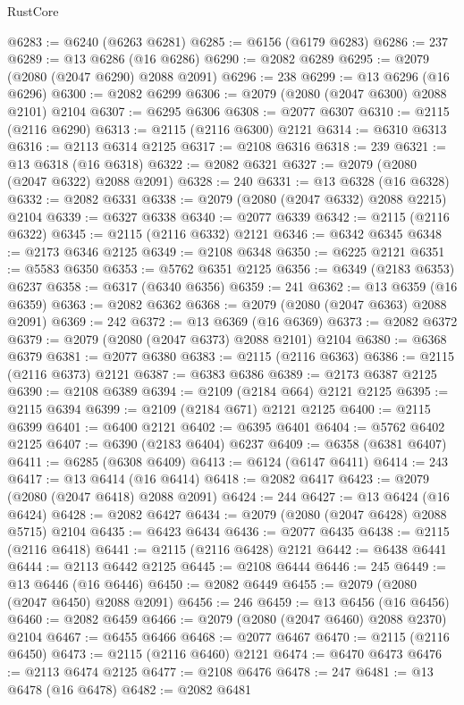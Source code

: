 \begin{lexlean}{RustCore}
\begin{coremodule}
@6283 := @6240 (@6263 @6281)
@6285 := @6156 (@6179 @6283)
@6286 := 237
@6289 := @13 @6286 (@16 @6286)
@6290 := @2082 @6289
@6295 := @2079 (@2080 (@2047 @6290) @2088 @2091)
@6296 := 238
@6299 := @13 @6296 (@16 @6296)
@6300 := @2082 @6299
@6306 := @2079 (@2080 (@2047 @6300) @2088 @2101) @2104
@6307 := @6295 @6306
@6308 := @2077 @6307
@6310 := @2115 (@2116 @6290)
@6313 := @2115 (@2116 @6300) @2121
@6314 := @6310 @6313
@6316 := @2113 @6314 @2125
@6317 := @2108 @6316
@6318 := 239
@6321 := @13 @6318 (@16 @6318)
@6322 := @2082 @6321
@6327 := @2079 (@2080 (@2047 @6322) @2088 @2091)
@6328 := 240
@6331 := @13 @6328 (@16 @6328)
@6332 := @2082 @6331
@6338 := @2079 (@2080 (@2047 @6332) @2088 @2215) @2104
@6339 := @6327 @6338
@6340 := @2077 @6339
@6342 := @2115 (@2116 @6322)
@6345 := @2115 (@2116 @6332) @2121
@6346 := @6342 @6345
@6348 := @2173 @6346 @2125
@6349 := @2108 @6348
@6350 := @6225 @2121
@6351 := @5583 @6350
@6353 := @5762 @6351 @2125
@6356 := @6349 (@2183 @6353) @6237
@6358 := @6317 (@6340 @6356)
@6359 := 241
@6362 := @13 @6359 (@16 @6359)
@6363 := @2082 @6362
@6368 := @2079 (@2080 (@2047 @6363) @2088 @2091)
@6369 := 242
@6372 := @13 @6369 (@16 @6369)
@6373 := @2082 @6372
@6379 := @2079 (@2080 (@2047 @6373) @2088 @2101) @2104
@6380 := @6368 @6379
@6381 := @2077 @6380
@6383 := @2115 (@2116 @6363)
@6386 := @2115 (@2116 @6373) @2121
@6387 := @6383 @6386
@6389 := @2173 @6387 @2125
@6390 := @2108 @6389
@6394 := @2109 (@2184 @664) @2121 @2125
@6395 := @2115 @6394
@6399 := @2109 (@2184 @671) @2121 @2125
@6400 := @2115 @6399
@6401 := @6400 @2121
@6402 := @6395 @6401
@6404 := @5762 @6402 @2125
@6407 := @6390 (@2183 @6404) @6237
@6409 := @6358 (@6381 @6407)
@6411 := @6285 (@6308 @6409)
@6413 := @6124 (@6147 @6411)
@6414 := 243
@6417 := @13 @6414 (@16 @6414)
@6418 := @2082 @6417
@6423 := @2079 (@2080 (@2047 @6418) @2088 @2091)
@6424 := 244
@6427 := @13 @6424 (@16 @6424)
@6428 := @2082 @6427
@6434 := @2079 (@2080 (@2047 @6428) @2088 @5715) @2104
@6435 := @6423 @6434
@6436 := @2077 @6435
@6438 := @2115 (@2116 @6418)
@6441 := @2115 (@2116 @6428) @2121
@6442 := @6438 @6441
@6444 := @2113 @6442 @2125
@6445 := @2108 @6444
@6446 := 245
@6449 := @13 @6446 (@16 @6446)
@6450 := @2082 @6449
@6455 := @2079 (@2080 (@2047 @6450) @2088 @2091)
@6456 := 246
@6459 := @13 @6456 (@16 @6456)
@6460 := @2082 @6459
@6466 := @2079 (@2080 (@2047 @6460) @2088 @2370) @2104
@6467 := @6455 @6466
@6468 := @2077 @6467
@6470 := @2115 (@2116 @6450)
@6473 := @2115 (@2116 @6460) @2121
@6474 := @6470 @6473
@6476 := @2113 @6474 @2125
@6477 := @2108 @6476
@6478 := 247
@6481 := @13 @6478 (@16 @6478)
@6482 := @2082 @6481

\end{coremodule}
\end{lexlean}
